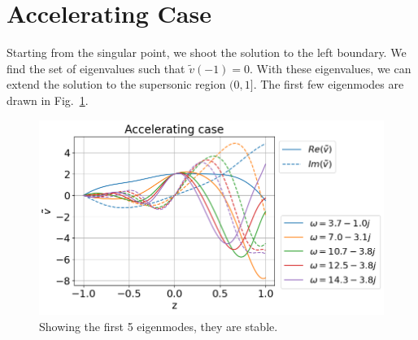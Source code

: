 \section{Accelerating Case}
Starting from the singular point, we shoot the solution to the left boundary. We find the set of eigenvalues such that $\tilde{v}(-1)=0$. With these eigenvalues, we can extend the solution to the supersonic region $(0,1]$. The first few eigenmodes are drawn in Fig.~\ref{fig:results-accelerating-v}.
\begin{figure} [H]
	\centering
	\includegraphics[width=0.7\linewidth]{figures/results-accelerating-v}
	\caption{Showing the first 5 eigenmodes, they are stable.}
	\label{fig:results-accelerating-v}
\end{figure}
